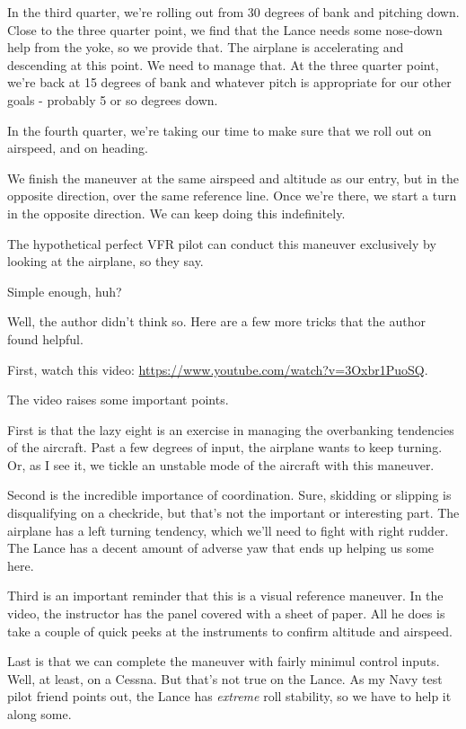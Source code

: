 In the third quarter, we're rolling out from 30 degrees of bank and pitching down. Close to the three quarter point, we find that the Lance needs some nose-down help from the yoke, so we provide that. The airplane is accelerating and descending at this point. We need to manage that. At the three quarter point, we're back at 15 degrees of bank and whatever pitch is appropriate for our other goals - probably 5 or so degrees down.

In the fourth quarter, we're taking our time to make sure that we roll out on airspeed, and on heading.

We finish the maneuver at the same airspeed and altitude as our entry, but in the opposite direction, over the same reference line. Once we're there, we start a turn in the opposite direction. We can keep doing this indefinitely.

The hypothetical perfect VFR pilot can conduct this maneuver exclusively by looking at the airplane, so they say.

Simple enough, huh?

Well, the author didn't think so. Here are a few more tricks that the author found helpful.

First, watch this video: \url{https://www.youtube.com/watch?v=3Oxbr1PuoSQ}.

The video raises some important points.

First is that the lazy eight is an exercise in managing the overbanking tendencies of the aircraft. Past a few degrees of input, the airplane wants to keep turning. Or, as I see it, we tickle an unstable mode of the aircraft with this maneuver.

Second is the incredible importance of coordination. Sure, skidding or slipping is disqualifying on a checkride, but that's not the important or interesting part. The airplane has a left turning tendency, which we'll need to fight with right rudder. The Lance has a decent amount of adverse yaw that ends up helping us some here.

Third is an important reminder that this is a visual reference maneuver. In the video, the instructor has the panel covered with a sheet of paper. All he does is take a couple of quick peeks at the instruments to confirm altitude and airspeed.

Last is that we can complete the maneuver with fairly minimul control inputs. Well, at least, on a Cessna. But that's not true on the Lance. As my Navy test pilot friend points out, the Lance has \emph{extreme} roll stability, so we have to help it along some.

